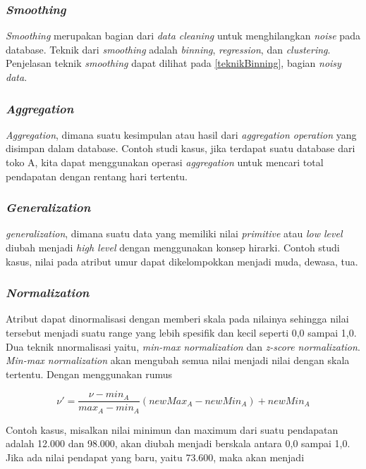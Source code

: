 \subsubsection{\textsl{Smoothing}}
\textsl{Smoothing} merupakan bagian dari \textsl{data cleaning} untuk menghilangkan \textsl{noise} pada database. Teknik dari \textsl{smoothing} adalah \textsl{binning}, \textsl{regression}, dan \textsl{clustering}. Penjelasan teknik \textsl{smoothing} dapat dilihat pada \ref{teknikBinning}, bagian \textsl{noisy data}.

\subsubsection{\textsl{Aggregation}}
\textsl{Aggregation}, dimana suatu kesimpulan atau hasil dari \textsl{aggregation operation} yang disimpan dalam database. Contoh studi kasus, jika terdapat suatu database dari toko A, kita dapat menggunakan operasi \textsl{aggregation} untuk mencari total pendapatan dengan rentang hari tertentu.

\subsubsection{\textsl{Generalization}}	
\textsl{generalization}, dimana suatu data yang memiliki nilai \textsl{primitive} atau \textsl{low level} diubah menjadi \textsl{high level} dengan menggunakan konsep hirarki. Contoh studi kasus, nilai pada atribut umur dapat dikelompokkan menjadi muda, dewasa, tua.	
	
\subsubsection{\textsl{Normalization}}
Atribut dapat dinormalisasi dengan memberi skala pada nilainya sehingga nilai tersebut menjadi suatu range yang lebih spesifik dan kecil seperti 0,0 sampai 1,0.
Dua teknik nnormalisasi yaitu, \textsl{min-max normalization} dan \textsl{z-score normalization}. \textsl{Min-max normalization} akan mengubah semua nilai menjadi nilai dengan skala tertentu. Dengan menggunakan rumus 

\begin{displaymath}
	\nu' = \frac{\nu-min_{A}}{max_{A}-min_{A}}(newMax_{A}-newMin_{A})+newMin_{A}	
\end{displaymath}

Contoh kasus, misalkan nilai minimun dan maximum dari suatu pendapatan adalah 12.000 dan 98.000, akan diubah menjadi berskala antara 0,0 sampai 1,0. Jika ada nilai pendapat yang baru, yaitu 73.600, maka akan menjadi

